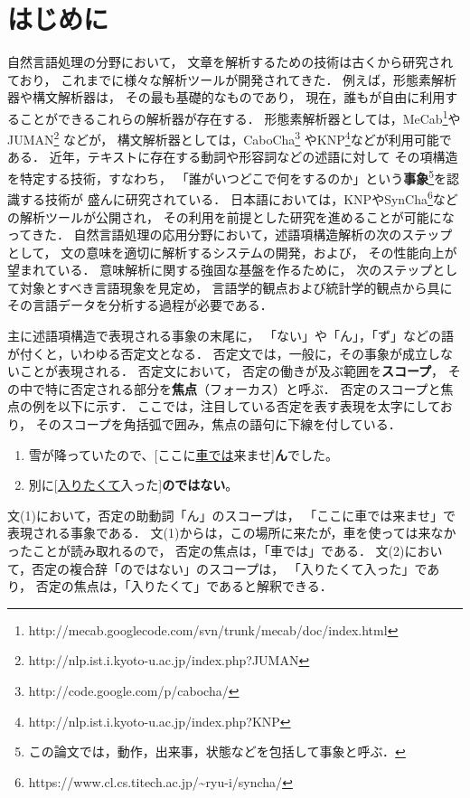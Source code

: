 \documentclass[japanese]{jnlp_1.4}
\begin{document}
\maketitle


\section{はじめに}\label{sec:intro}

自然言語処理の分野において，
文章を解析するための技術は古くから研究されており，
これまでに様々な解析ツールが開発されてきた．
例えば，形態素解析器や構文解析器は，
その最も基礎的なものであり，
現在，誰もが自由に利用することができるこれらの解析器が存在する．
形態素解析器としては，MeCab\footnote{
http://mecab.googlecode.com/svn/trunk/mecab/doc/index.html}やJUMAN\footnote{
http://nlp.ist.i.kyoto-u.ac.jp/index.php?JUMAN}
などが，
構文解析器としては，CaboCha\footnote{
http://code.google.com/p/cabocha/}
やKNP\footnote{
http://nlp.ist.i.kyoto-u.ac.jp/index.php?KNP}などが利用可能である．
近年，テキストに存在する動詞や形容詞などの述語に対して
その項構造を特定する技術，すなわち，
「誰がいつどこで何をするのか」という\textbf{事象}\footnote{
この論文では，動作，出来事，状態などを包括して事象と呼ぶ．}を認識する技術が
盛んに研究されている．
日本語においては，KNPやSynCha\footnote{
https://www.cl.cs.titech.ac.jp/{\textasciitilde}ryu-i/syncha/}などの解析ツールが公開され，
その利用を前提とした研究を進めることが可能になってきた．
自然言語処理の応用分野において，述語項構造解析の次のステップとして，
文の意味を適切に解析するシステムの開発，および，
その性能向上が望まれている．
意味解析に関する強固な基盤を作るために，
次のステップとして対象とすべき言語現象を見定め，
言語学的観点および統計学的観点から具にその言語データを分析する過程が必要である．

主に述語項構造で表現される事象の末尾に，
「ない」や「ん」，「ず」などの語が付くと，いわゆる否定文となる．
否定文では，一般に，その事象が成立しないことが表現される．
否定文において，
否定の働きが及ぶ範囲を\textbf{スコープ}，
その中で特に否定される部分を\textbf{焦点}（フォーカス）と呼ぶ\cite{neg2007}．
否定のスコープと焦点の例を以下に示す．
ここでは，注目している否定を表す表現を太字にしており，
そのスコープを角括弧で囲み，焦点の語句に下線を付している．
\begin{enumerate}
\item 雪が降っていたので、[ここに\underline{車では}来ませ]\textbf{ん}でした。
\item 別に[\underline{入りたくて}入った]\textbf{のではない}。
\end{enumerate}
文(1)において，否定の助動詞「ん」のスコープは，
「ここに車では来ませ」で表現される事象である．
文(1)からは，この場所に来たが，車を使っては来なかったことが読み取れるので，
否定の焦点は，「車では」である．
文(2)において，否定の複合辞「のではない」のスコープは，
「入りたくて入った」であり，
否定の焦点は，「入りたくて」であると解釈できる．
\end{document}

